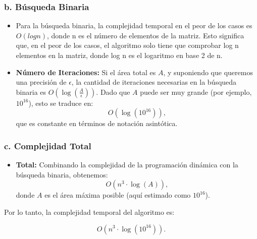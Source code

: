 \documentclass{article}
\begin{document}
\subsubsection{b. Búsqueda Binaria}

\begin{itemize}
	\item Para la búsqueda binaria, la complejidad temporal en el peor de los casos es $O(log n)$, donde n es el número de elementos de la matriz. Esto significa que, en el peor de los casos, el algoritmo solo tiene que comprobar log n elementos en la matriz, donde log n es el logaritmo en base 2 de n.
	
    \item \textbf{Número de Iteraciones:} Si el área total es \( A \), y suponiendo que queremos una precisión de \( \epsilon \), la cantidad de iteraciones necesarias en la búsqueda binaria es \( O(\log(\frac{A}{\epsilon})) \). Dado que \( A \) puede ser muy grande (por ejemplo, \( 10^{16} \)), esto se traduce en:
    \[
    O(\log(10^{16})),
    \]
    que es constante en términos de notación asintótica.
\end{itemize}

\subsubsection{c. Complejidad Total}

\begin{itemize}
    \item \textbf{Total:} Combinando la complejidad de la programación dinámica con la búsqueda binaria, obtenemos:
    \[
    O(n^3 \cdot \log(A)),
    \]
    donde \( A \) es el área máxima posible (aquí estimado como \( 10^{16} \)).
\end{itemize}

Por lo tanto, la complejidad temporal del algoritmo es:

\[
O(n^3 \cdot \log(10^{16})).
\]
\end{document}
